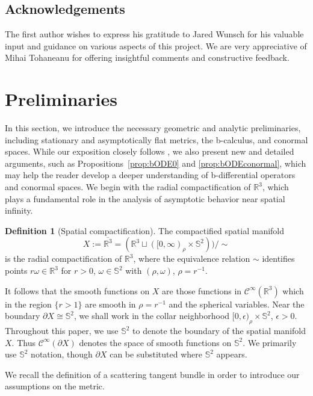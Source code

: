 \documentclass[10pt,a4paper,reqno]{amsart}
\newcommand{\CI}{\mathcal{C}^\infty}
\newcommand{\RR}{\mathbb{R}}
\newcommand{\ol}{\overline}
\newcommand{\Sph}{\mathbb{S}}
\newcommand{\pa}{\partial}
\renewcommand{\S}{{\mathbb S}}
\theoremstyle{definition}
\newtheorem{definition}[theorem]{Definition}
\theoremstyle{remark}
\numberwithin{equation}{section}
\newcommand{\R}{\mathbb R}
\begin{document}
\subsection{Acknowledgements}The first author wishes to express his gratitude to Jared Wunsch for his valuable input and guidance on various aspects of this project. We are very appreciative of Mihai Tohaneanu for offering insightful comments and constructive feedback.

\section{Preliminaries}\label{sec:prelim}



In this section, we introduce the necessary geometric and analytic preliminaries, including stationary and asymptotically flat metrics, the b-calculus, and conormal spaces. While our exposition closely follows \cite{Hin22}, we also present new and detailed arguments, such as Propositions~\ref{prop:bODE0} and \ref{prop:bODEconormal}, which may help the reader develop a deeper understanding of b-differential operators and conormal spaces. We begin with the radial compactification of $\RR^3$, which plays a fundamental role in the analysis of asymptotic behavior near spatial infinity.
\begin{definition}[Spatial compactification]
    \label{DefACompact}
      The compactified spatial manifold 
      \[
        X := \ol{\R^3} = (\RR^3\sqcup([0,\infty)_\rho\times\Sph^2))/\sim
      \]
      is the radial compactification of $\R^3$, where the equivalence relation $\sim$ identifies points $r\omega\in\R^3$ for $r>0$, $\omega\in\Sph^2$ with $(\rho,\omega)$, $\rho=r^{-1}$.
    \end{definition}

\noindent  
It follows that the smooth functions on $X$ are those functions in $\CI(\RR^3)$ which in the region $\{r>1\}$ are smooth in $\rho=r^{-1}$ and the spherical variables. Near the boundary $\pa X\cong\S^2$, we shall work in the collar neighborhood $[0,\epsilon)_\rho\times\S^2$, $\epsilon>0$. Throughout this paper, we use $\mathbb{S}^2$ to denote the boundary of the spatial manifold $X$. Thus $\CI(\partial X)$ denotes the space of smooth functions on $\mathbb{S}^2$. We primarily use $\mathbb{S}^2$ notation, though $\partial X$ can be substituted where $\mathbb{S}^2$ appears.

We recall the definition of a scattering tangent bundle in order to introduce our assumptions on the metric.
\end{document}
